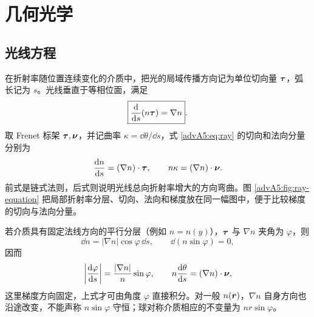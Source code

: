 \section{几何光学}

\subsection{光线方程}

在折射率随位置连续变化的介质中，把光的局域传播方向记为单位切向量
$\vect\tau$，弧长记为 $s$。光线垂直于等相位面，满足
\begin{equation}\label{advA5:eq:ray}
 \boxed{\frac{\dd}{\dd s}(n\vect\tau)=\nabla n}.
\end{equation}
取 Frenet 标架 $\vect\tau,\vect\nu$，并记曲率
$\kappa=\dd\theta/\dd s$，式 \eqref{advA5:eq:ray} 的切向和法向分量分别为
\[
 \frac{\dd n}{\dd s}=(\nabla n)\cdot\vect\tau,\qquad
 n\kappa=(\nabla n)\cdot\vect\nu .
\]
前式是链式法则，后式则说明光线总向折射率增大的方向弯曲。图
\ref{advA5:fig:ray-equation} 把局部折射率分层、切向、法向和梯度放在同一幅图中，便于比较梯度的切向与法向分量。

\begin{center}\begin{minipage}{\linewidth}\centering
\centering
{}
\label{advA5:fig:ray-equation}
\end{minipage}\end{center}

若介质具有固定法线方向的平行分层（例如 $n=n(y)$），$\vect\tau$ 与 $\nabla n$ 夹角为
$\varphi$，则
\[
 \dd n=|\nabla n|\cos\varphi\,\dd s,\qquad
 \dd(n\sin\varphi)=0,
\]
因而
\[
 \left|\frac{\dd\varphi}{\dd s}\right|
 =\frac{|\nabla n|}{n}\sin\varphi,\qquad
 n\frac{\dd\theta}{\dd s}=(\nabla n)\cdot\vect\nu,
\]
这里梯度方向固定，上式才可由角度 $\varphi$ 直接积分。对一般 $n(\vect r)$，$\nabla n$ 自身方向也沿途改变，不能声称 $n\sin\varphi$ 守恒；球对称介质相应的不变量为 $nr\sin\varphi$。

